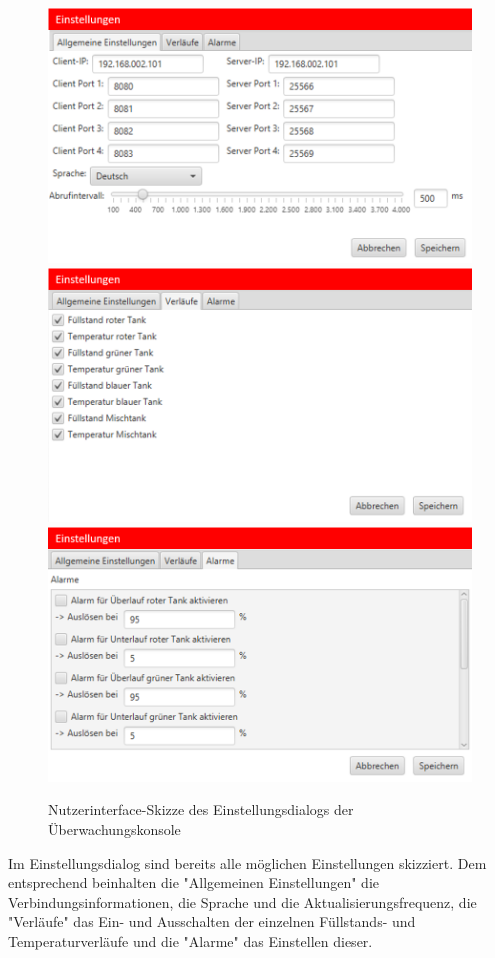 \documentclass[parskip=full]{scrartcl}
\begin{document}
\begin{figure}[h!]
	\centering
	\includegraphics[scale=0.5]{media/ui-client/ui-uw-settings1.png}
	\includegraphics[scale=0.5]{media/ui-client/ui-uw-settings2.png}
	\includegraphics[scale=0.5]{media/ui-client/ui-uw-settings3.png}
	\caption{Nutzerinterface-Skizze des Einstellungsdialogs der Überwachungskonsole}
\end{figure}
Im Einstellungsdialog sind bereits alle möglichen Einstellungen skizziert. Dem entsprechend beinhalten die "Allgemeinen Einstellungen" die Verbindungsinformationen, die Sprache und die Aktualisierungsfrequenz, die "Verläufe" das Ein- und Ausschalten der einzelnen Füllstands- und Temperaturverläufe und die "Alarme" das Einstellen dieser.
\end{document}
